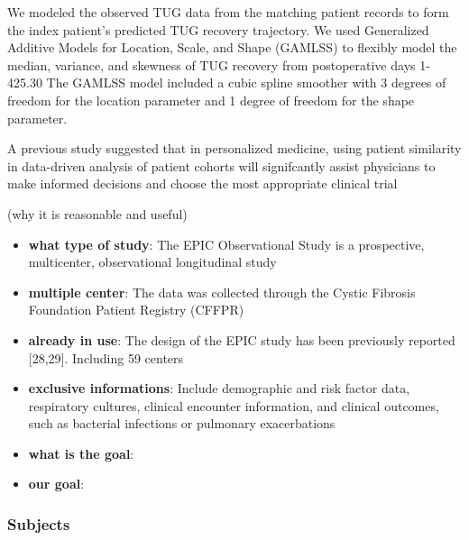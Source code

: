 \documentclass{article}
\begin{document}
We modeled the observed TUG data from the matching patient records to
form the index patient's predicted TUG recovery trajectory. We used
Generalized Additive Models for Location, Scale, and Shape (GAMLSS) to
flexibly model the median, variance, and skewness of TUG recovery from
postoperative days 1-425.30 The GAMLSS model included a cubic spline
smoother with 3 degrees of freedom for the location parameter and 1
degree of freedom for the shape parameter.

A previous study suggested that in personalized medicine, using patient
similarity in data-driven analysis of patient cohorts will signifcantly
assist physicians to make informed decisions and choose the most
appropriate clinical trial

(why it is reasonable and useful)

\begin{itemize}
\item
  \textbf{what type of study}: The EPIC Observational Study is a
  prospective, multicenter, observational longitudinal study
\item
  \textbf{multiple center}: The data was collected through the Cystic
  Fibrosis Foundation Patient Registry (CFFPR)
\item
  \textbf{already in use}: The design of the EPIC study has been
  previously reported {[}28,29{]}. Including 59 centers
\item
  \textbf{exclusive informations}: Include demographic and risk factor
  data, respiratory cultures, clinical encounter information, and
  clinical outcomes, such as bacterial infections or pulmonary
  exacerbations
\item
  \textbf{what is the goal}:
\item
  \textbf{our goal}:
\end{itemize}

\hypertarget{subjects}{%
\subsubsection{Subjects}\label{subjects}}
\end{document}
